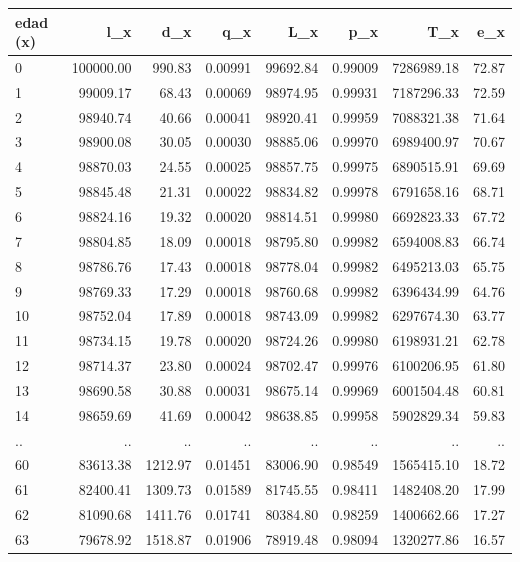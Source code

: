 \documentclass[12pt]{article}
\begin{document}
\begin{table}[htbp]
\begin{tabular}{lrrrrrrr}
  \hline
 edad (x) & l_x & d_x & q_x & L_x & p_x & T_x & e_x \\ 
  \hline
 0 & 100000.00 & 990.83 & 0.00991 & 99692.84 & 0.99009 & 7286989.18 & 72.87 \\ 
 1 & 99009.17 & 68.43 & 0.00069 & 98974.95 & 0.99931 & 7187296.33 & 72.59 \\ 
 2 & 98940.74 & 40.66 & 0.00041 & 98920.41 & 0.99959 & 7088321.38 & 71.64 \\ 
 3 & 98900.08 & 30.05 & 0.00030 & 98885.06 & 0.99970 & 6989400.97 & 70.67 \\ 
 4 & 98870.03 & 24.55 & 0.00025 & 98857.75 & 0.99975 & 6890515.91 & 69.69 \\ 
 5 & 98845.48 & 21.31 & 0.00022 & 98834.82 & 0.99978 & 6791658.16 & 68.71 \\ 
 6 & 98824.16 & 19.32 & 0.00020 & 98814.51 & 0.99980 & 6692823.33 & 67.72 \\ 
 7 & 98804.85 & 18.09 & 0.00018 & 98795.80 & 0.99982 & 6594008.83 & 66.74 \\ 
 8 & 98786.76 & 17.43 & 0.00018 & 98778.04 & 0.99982 & 6495213.03 & 65.75 \\ 
 9 & 98769.33 & 17.29 & 0.00018 & 98760.68 & 0.99982 & 6396434.99 & 64.76 \\ 
 10 & 98752.04 & 17.89 & 0.00018 & 98743.09 & 0.99982 & 6297674.30 & 63.77 \\ 
 11 & 98734.15 & 19.78 & 0.00020 & 98724.26 & 0.99980 & 6198931.21 & 62.78 \\ 
 12 & 98714.37 & 23.80 & 0.00024 & 98702.47 & 0.99976 & 6100206.95 & 61.80 \\ 
 13 & 98690.58 & 30.88 & 0.00031 & 98675.14 & 0.99969 & 6001504.48 & 60.81 \\ 
 14 & 98659.69 & 41.69 & 0.00042 & 98638.85 & 0.99958 & 5902829.34 & 59.83 \\ 
   \hline
.. & .. & .. & .. & .. & .. & .. & ..\\
  \hline
 60 & 83613.38 & 1212.97 & 0.01451 & 83006.90 & 0.98549 & 1565415.10 & 18.72 \\ 
 61 & 82400.41 & 1309.73 & 0.01589 & 81745.55 & 0.98411 & 1482408.20 & 17.99 \\ 
 62 & 81090.68 & 1411.76 & 0.01741 & 80384.80 & 0.98259 & 1400662.66 & 17.27 \\ 
 63 & 79678.92 & 1518.87 & 0.01906 & 78919.48 & 0.98094 & 1320277.86 & 16.57 \\ 

\end{tabular}
\end{table}
\end{document}
